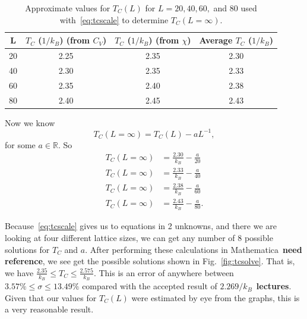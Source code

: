 \documentclass[12pt]{article}
\numberwithin{equation}{section}
\begin{document}
\begin{table}[ht]
\begin{center}
\begin{tabular}{c|c|c|c} \hline
L & $T_{C}$ ($1/k_{B}$) (from $C_{V}$) & $T_{C}$ ($1/k_{B}$) (from $\chi$) & Average $T_{C}$ ($1/k_{B}$)\\ \hline
20 & 2.25 & 2.35 & 2.30 \\
40 & 2.30 & 2.35 & 2.33 \\
60 & 2.35 & 2.40 & 2.38 \\
80 & 2.40 & 2.45 & 2.43\\ \hline
\end{tabular}
\caption{Approximate values for $T_{C}(L)$ for $L=20, 40, 60,$ and 80 used with~\eqref{eq:tcscale} to determine $T_{C}(L=\infty)$.}
\label{tab:tcl}
\end{center}
\end{table}

\par  Now we know 
$$
T_{C}(L=\infty)=T_{C}(L)-aL^{-1},
$$
for some $a\in\mathbb{R}$.  So
\begin{align*}
T_{C}(L=\infty) & = \frac{2.30}{k_{B}}-\frac{a}{20} \\
T_{C}(L=\infty) & = \frac{2.33}{k_{B}}-\frac{a}{40} \\
T_{C}(L=\infty) & = \frac{2.38}{k_{B}}-\frac{a}{60} \\
T_{C}(L=\infty) & = \frac{2.43}{k_{B}}-\frac{a}{80}.
\end{align*}
\par Because~\eqref{eq:tcscale} gives us to equations in 2 unknowns, and there we are looking at four different lattice sizes, we can get any number of 8 possible solutions for $T_{C}$ and $a$.  After performing these calculations in Mathematica~\textbf{need reference}, we see get the possible solutions shown in Fig.~\ref{fig:tcsolve}.  That is, we have $\frac{2.35}{k_{B}}\leq T_{C}\leq\frac{2.575}{k_{B}}$.  This is an error of anywhere between $3.57\%\leq\sigma\leq13.49\%$ compared with the accepted result of $2.269/k_{B}$~\textbf{lectures}.  Given that our values for $T_{C}(L)$ were estimated by eye from the graphs, this is a very reasonable result.
\end{document}
